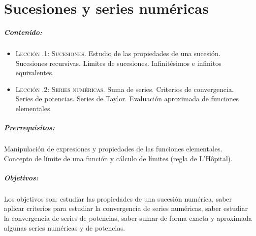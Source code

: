 %
%
\chapter{Sucesiones y series numéricas}\label{tema:suc-ser}

\pagestyle{temas}
\thispagestyle{primera}

\paragraph{Contenido:}
\begin{itemize}

\item
{\scshape Lección \thechapter.1: Sucesiones.}
Estudio de las propiedades de una sucesión.
Sucesiones recursivas.
Límites de sucesiones.
Infinitésimos e infinitos equivalentes.
\item
{\scshape Lección \thechapter.2: Series numéricas.}
Suma de series.
Criterios de convergencia.
Series de potencias.
Series de Taylor.
Evaluación aproximada de funciones elementales.

\end{itemize}

\paragraph{Prerrequisitos:}
Manipulación de expresiones y propiedades de las funciones elementales. Concepto de límite de una función y cálculo de límites (regla de L'Hôpital).



\paragraph{Objetivos:}
Los objetivos son:
estudiar las propiedades de una sucesión numérica,
saber aplicar criterios para estudiar la convergencia de series numéricas,
saber estudiar la convergencia de series de potencias,
saber sumar de forma exacta y aproximada algunas series numéricas y de potencias.

